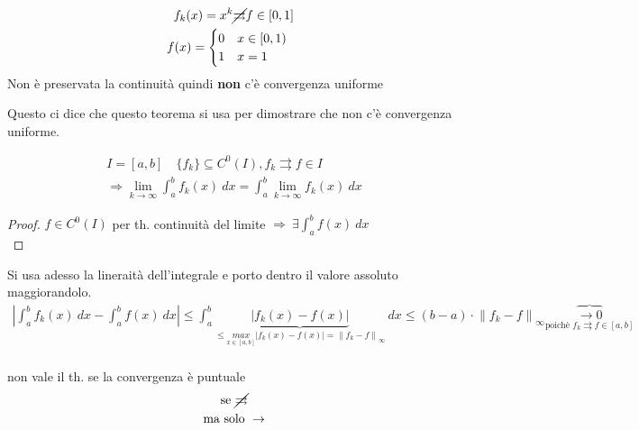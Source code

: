 \documentclass[a4paper, oneside]{article}
\begin{document}
  \begin{observation}
    \begin{gather*}
      f_k(x) = x^k \cancel{\rightrightarrows} f \in [0,1]\\
      f(x) = \begin{cases}
        0 \quad x \in [0,1)\\
        1 \quad x = 1
      \end{cases}\\
    \end{gather*}
    Non è preservata la continuità quindi \textbf{non} c'è convergenza uniforme
  \end{observation}
  Questo ci dice che questo teorema si usa per dimostrare che non c'è convergenza uniforme.

\begin{theorem}
  \begin{gather*}
    I = [a,b] \quad \{ f_k \} \subseteq C^0 (I), f_k \rightrightarrows f \in I\\
    \Rightarrow \lim_{k \to \infty} \int_a^b f_k(x) \ dx = \int_a^b \lim_{k \to \infty} f_k(x) \ dx
  \end{gather*}
\end{theorem}

\begin{proof}
  $f \in C^0 (I)$ per th. continuità del limite $\Rightarrow \ \exists \int_a^b f(x) \ dx$ \\
\end{proof}
Si usa adesso la lineraità dell'integrale e porto dentro il valore assoluto maggiorandolo.
\begin{gather*}
  \left\lvert \int_a^b f_k(x) \ dx - \int_a^b f(x) \ dx \right\rvert  \leq \int_a^b \underbrace{\left\lvert f_k(x) - f(x) \right\rvert}_{\leq \underset{x \in [a,b]}{max} \left\lvert f_k(x) - f(x) \right\rvert = \left\lVert f_k - f \right\rVert_\infty  } \ dx \leq (b-a) \cdot \left\lVert f_k - f \right\rVert_\infty \overbrace{\to 0 }_{\text{poichè } f_k \rightrightarrows f \in [a,b]}\\
\end{gather*}
\begin{observation}
  non vale il th. se la convergenza è puntuale
  \begin{gather*}
    \text{se } \cancel{\rightrightarrows }\\
    \text{ma solo } \to 
  \end{gather*}
\end{observation}
\end{document}
